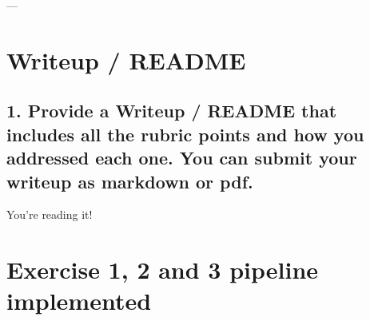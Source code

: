 \documentclass{article}
\begin{document}









---
\section{Writeup / README}

\subsection{1. Provide a Writeup / README that includes all the rubric points and how you addressed each one.  You can submit your writeup as markdown or pdf.}

You're reading it!

\section{Exercise 1, 2 and 3 pipeline implemented}
\end{document}
